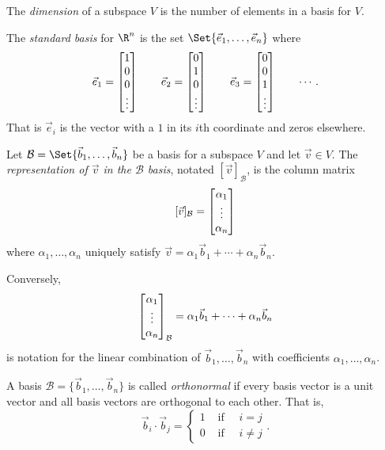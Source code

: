 \begin{SaveDefinition}[key=Dimension, title={Dimension}]
	The
	\emph{dimension} of a subspace $V$ is the number of elements in a basis
	for $V$.
\end{SaveDefinition}

\begin{SaveDefinition}[key=StandardBasisforRn, title={Standard Basis}]
	The \emph{standard basis} for $\R^n$ is the set $\Set{\vec e_1,\ldots,\vec e_n}$ where
	\[
		\vec e_1=\begin{bmatrix}1\\0\\0\\\vdots\end{bmatrix}\qquad
		\vec e_2=\begin{bmatrix}0\\1\\0\\\vdots\end{bmatrix}\qquad
		\vec e_3=\begin{bmatrix}0\\0\\1\\\vdots\end{bmatrix}\qquad\cdots.
	\]
	That is $\vec e_i$ is the vector with a $1$ in its
	$i$th coordinate and zeros elsewhere.
\end{SaveDefinition}

\begin{SaveDefinition}[
	key=RepresentationinaBasis,
	title={Representation in a Basis}]

	Let $\mathcal B=\Set{\vec b_1,\ldots,\vec b_n}$ be a basis for a
	subspace $V$ and let $\vec v\in V$. The
	\emph{representation of $\vec v$ in the $\mathcal B$ basis}, notated $[\vec
	v]_{\mathcal B}$, is the column matrix
	\[
		[\vec v]_{\mathcal B}= \begin{bmatrix}\alpha_1\\\vdots\\\alpha_n\end{bmatrix}
	\]
	 where $\alpha_{1},\ldots,\alpha_{n}$ uniquely satisfy
	$\vec v=\alpha_{1}\vec b_{1}+\cdots+\alpha_{n}\vec b_{n}.$

	Conversely,
	\[
		\begin{bmatrix}\alpha_1\\\vdots\\\alpha_n\end{bmatrix}_{\mathcal B}= \alpha_{1}\vec b_{1}+\cdots
		+\alpha_{n}\vec b_{n}
	\]
	 is notation for the linear combination of $\vec b_{1},\ldots,\vec b_{n}$
	with coefficients $\alpha_{1},\ldots,\alpha_{n}$.
\end{SaveDefinition}

\begin{SaveDefinition}[key=OrthonormalBasis, title={Orthonormal Basis}]
	A basis $\mathcal B=\{\vec b_{1},\ldots,\vec b_{n}\}$ is called
	\emph{orthonormal} if every basis vector is a unit vector and all
	basis vectors are orthogonal to each other. That is,
	\[
		\vec b_i\cdot \vec b_j=\begin{cases}
			1 &\text{ if }\quad i=j\\
			0 &\text{ if }\quad i\neq j
		\end{cases}.
	\]
\end{SaveDefinition}

